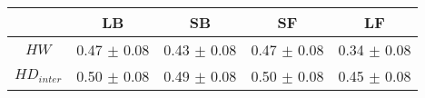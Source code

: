 \begin{tabular}{c c c c c }
\hline
 & LB & SB & SF & LF \\
\hline
$HW$ & 0.47 $\pm$ 0.08 & 0.43 $\pm$ 0.08 & 0.47 $\pm$ 0.08 & 0.34 $\pm$ 0.08 \\
$HD_{inter}$ & 0.50 $\pm$ 0.08 & 0.49 $\pm$ 0.08 & 0.50 $\pm$ 0.08 & 0.45 $\pm$ 0.08 \\
\hline
\end{tabular}